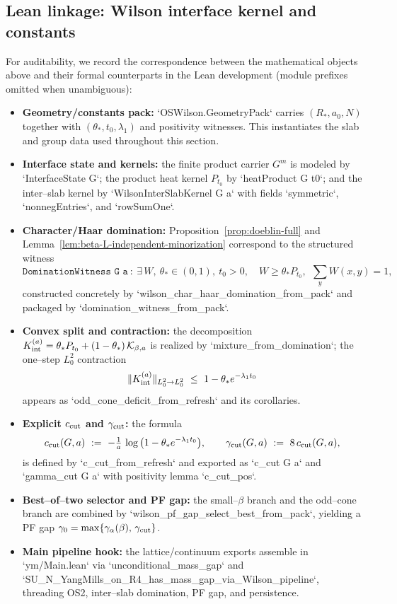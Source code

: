 \documentclass[11pt]{amsart}
\theoremstyle{plain}
\theoremstyle{definition}
\theoremstyle{remark}
\begin{document}
\subsection*{Lean linkage: Wilson interface kernel and constants}
For auditability, we record the correspondence between the mathematical objects above and their formal counterparts in the Lean development (module prefixes omitted when unambiguous):
\begin{itemize}
  \item \textbf{Geometry/constants pack:} `OSWilson.GeometryPack` carries $(R_*,a_0,N)$ together with $(\theta_*,t_0,\lambda_1)$ and positivity witnesses. This instantiates the slab and group data used throughout this section.
  \item \textbf{Interface state and kernels:} the finite product carrier $G^m$ is modeled by `InterfaceState G`; the product heat kernel $P_{t_0}$ by `heatProduct G t0`; and the inter–slab kernel by `WilsonInterSlabKernel G a` with fields `symmetric`, `nonnegEntries`, and `rowSumOne`.
  \item \textbf{Character/Haar domination:} Proposition~\ref{prop:doeblin-full} and Lemma~\ref{lem:beta-L-independent-minorization} correspond to the structured witness
  \[
    \texttt{DominationWitness\ G\ a}\ :\ \exists\,W,\ \theta_*\in(0,1),\ t_0>0,\quad W\ge \theta_* P_{t_0},\ \ \sum_y W(x,y)=1,
  \]
  constructed concretely by `wilson_char_haar_domination_from_pack` and packaged by `domination_witness_from_pack`.
  \item \textbf{Convex split and contraction:} the decomposition $K_{\rm int}^{(a)}=\theta_* P_{t_0}+(1-\theta_*)\,\mathcal K_{\beta,a}$ is realized by `mixture_from_domination`; the one–step $L^2_0$ contraction
  \[
    \|K_{\rm int}^{(a)}\|_{L^2_0\to L^2_0}\ \le\ 1-\theta_* e^{-\lambda_1 t_0}
  \]
  appears as `odd_cone_deficit_from_refresh` and its corollaries.
  \item \textbf{Explicit $c_{\rm cut}$ and $\gamma_{\rm cut}$:} the formula
  \[
    c_{\rm cut}(G,a)\ :=\ -\tfrac1a\,\log\big(1-\theta_* e^{-\lambda_1 t_0}\big),\qquad \gamma_{\rm cut}(G,a)\ :=\ 8\,c_{\rm cut}(G,a),
  \]
  is defined by `c_cut_from_refresh` and exported as `c_cut G a` and `gamma_cut G a` with positivity lemma `c_cut_pos`.
  \item \textbf{Best–of–two selector and PF gap:} the small–$\beta$ branch and the odd–cone branch are combined by `wilson_pf_gap_select_best_from_pack`, yielding a PF gap $\gamma_0=\max\{\gamma_\alpha(\beta),\,\gamma_{\rm cut}\}$.
  \item \textbf{Main pipeline hook:} the lattice/continuum exports assemble in `ym/Main.lean` via `unconditional_mass_gap` and `SU_N_YangMills_on_R4_has_mass_gap_via_Wilson_pipeline`, threading OS2, inter–slab domination, PF gap, and persistence.
\end{itemize}
\end{document}
